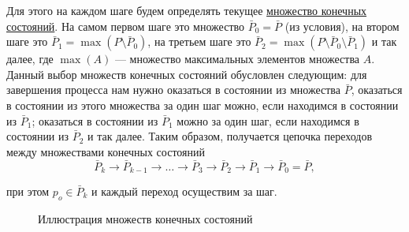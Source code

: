 Для этого на каждом шаге будем определять текущее \underline{множество конечных состояний}. На самом первом шаге это множество $\bar{P}_0 = \bar{P}$ (из условия), на втором шаге это $\bar{P}_1 = \max(P \setminus \bar{P}_0)$, на третьем шаге это $\bar{P}_2 = \max(P \setminus \bar{P}_0 \setminus \bar{P}_1)$ и так далее, где $\max(A)$ --- множество максимальных элементов множества $A$. Данный выбор множеств конечных состояний обусловлен следующим: для завершения процесса нам нужно оказаться в состоянии из множества $\bar{P}$, оказаться в состоянии из этого множества за один шаг можно, если находимся в состоянии из $\bar{P}_1$; оказаться в состоянии из $\bar{P}_1$ можно за один шаг, если находимся в состоянии из $\bar{P}_2$ и так далее. Таким образом, получается цепочка переходов между множествами конечных состояний
\[
\bar{P}_k \to \bar{P}_{k-1} \to \dots \to \bar{P}_3 \to \bar{P}_2 \to \bar{P}_1 \to \bar{P}_0 = \bar{P},
\]

при этом $p_o \in \bar{P}_k$ и каждый переход осуществим за шаг.

\begin{figure}[H]
	\centering
	\caption{Иллюстрация множеств конечных состояний}
\end{figure}

